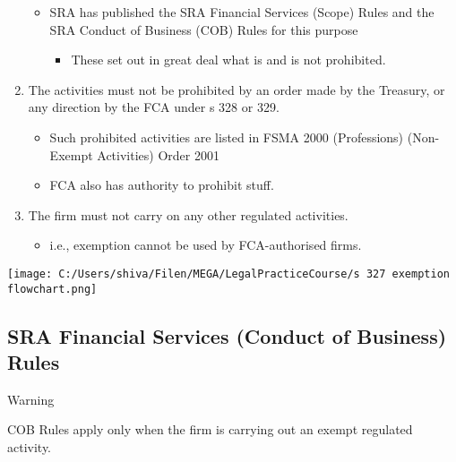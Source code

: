 \documentclass[
]{article}
\providecommand{\tightlist}{%
  \setlength{\itemsep}{0pt}\setlength{\parskip}{0pt}}
\newenvironment{env-0cb2e3ab-3bde-42f2-97ad-ac1eecea3f6d}
{
    \savenotes\tcolorbox[blanker,breakable,left=5pt,borderline west={2pt}{-4pt}{orange}]
}
{
    \endtcolorbox\spewnotes
}
\begin{document}
\begin{enumerate}
  \begin{itemize}
  \tightlist
  \item
    SRA has published the SRA Financial Services (Scope) Rules and the
    SRA Conduct of Business (COB) Rules for this purpose

    \begin{itemize}
    \tightlist
    \item
      These set out in great deal what is and is not prohibited.
    \end{itemize}
  \end{itemize}
\item
  The activities must not be prohibited by an order made by the
  Treasury, or any direction by the FCA under s 328 or 329.

  \begin{itemize}
  \tightlist
  \item
    Such prohibited activities are listed in FSMA 2000 (Professions)
    (Non-Exempt Activities) Order 2001
  \item
    FCA also has authority to prohibit stuff.
  \end{itemize}
\item
  The firm must not carry on any other regulated activities.

  \begin{itemize}
  \tightlist
  \item
    i.e., exemption cannot be used by FCA-authorised firms.
  \end{itemize}
\end{enumerate}

\texttt{[image: C:/Users/shiva/Filen/MEGA/LegalPracticeCourse/s 327 exemption flowchart.png]}

\hypertarget{sra-financial-services-conduct-of-business-rules}{%
\subsection{SRA Financial Services (Conduct of Business)
Rules}\label{sra-financial-services-conduct-of-business-rules}}

\begin{env-0cb2e3ab-3bde-42f2-97ad-ac1eecea3f6d}

Warning

COB Rules apply only when the firm is carrying out an exempt regulated
activity.

\end{env-0cb2e3ab-3bde-42f2-97ad-ac1eecea3f6d}
\end{document}
